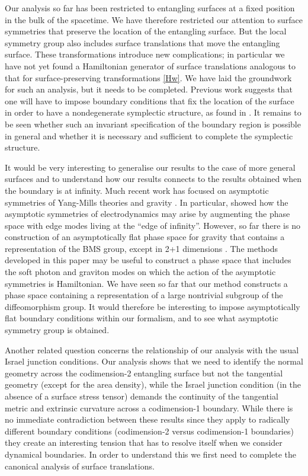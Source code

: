 \documentclass[a4paper,11pt]{article}
\begin{document}
Our analysis so far has been restricted to entangling surfaces at a fixed position in the bulk of the spacetime. 
We have therefore restricted our attention to surface symmetries that preserve the location of the entangling surface.
But the local symmetry group also includes surface translations that move the entangling surface.
These transformations introduce new complications; in particular we have not yet found a Hamiltonian generator of surface translations analogous to that for surface-preserving transformations \eqref{Hw}.
We have laid the groundwork for such an analysis, but it needs to be completed. 
Previous work suggests that one will have to impose boundary conditions that fix the location of the surface in order to have a nondegenerate symplectic structure, as found in \cite{Carlip1999}.
It remains to be seen whether such an invariant specification of the boundary region is possible in general and whether it is  necessary and sufficient to complete the symplectic structure.

It would be very interesting to generalise our results to the case of more general surfaces  and to understand how our results connects to the results obtained when the boundary is at infinity.
Much recent work has focused on asymptotic symmetries of Yang-Mills theories \cite{Strominger2013a,He2014b} and gravity \cite{Strominger2013b,He:2014laa}.
In particular, \cite{Mohd:2014oja} showed how the asymptotic symmetries of electrodynamics may arise by augmenting the phase space with edge modes living at the ``edge of infinity''.
However, so far there is no construction of an asymptotically flat phase space for gravity that contains a representation of the BMS group, except in 2+1 dimensions \cite{Andrade:2015fna}.
The methods developed in this paper may be useful to construct a phase space that includes the soft photon and graviton modes on which the action of the asymptotic symmetries is Hamiltonian.
We have seen so far that our method constructs a phase space containing a representation of a large nontrivial subgroup of the diffeomorphism group.
It would therefore be interesting to impose asymptotically flat boundary conditions within our formalism, and to see what asymptotic symmetry group is obtained.

Another related question concerns the relationship of our analysis with the usual Israel junction conditions.
Our analysis shows that we need to identify the normal geometry across the codimension-2 entangling surface but not the tangential geometry (except for the area density), while the Israel junction condition (in the absence of a surface stress tensor) demands the continuity of the tangential metric and extrinsic curvature across a codimension-1 boundary.
While there is no immediate contradiction between these results since they apply to radically different boundary conditions (codimension-2 versus codimension-1 boundaries) they create an interesting tension that has to resolve itself when we consider dynamical boundaries.
In order to understand this we first need to complete the canonical analysis of surface translations.
\end{document}
